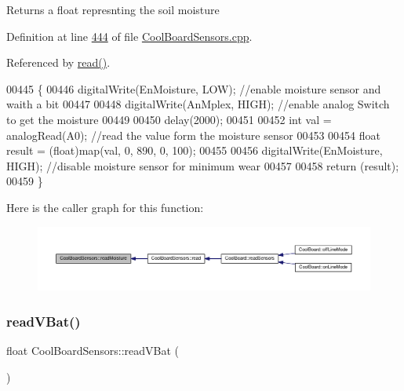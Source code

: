 \begin{DoxyReturn}{Returns}
a float represnting the soil moisture 
\end{DoxyReturn}


Definition at line \hyperlink{_cool_board_sensors_8cpp_source_l00444}{444} of file \hyperlink{_cool_board_sensors_8cpp_source}{Cool\+Board\+Sensors.\+cpp}.



Referenced by \hyperlink{_cool_board_sensors_8cpp_source_l00123}{read()}.


\begin{DoxyCode}
00445 \{
00446       digitalWrite(EnMoisture, LOW);                 \textcolor{comment}{//enable moisture sensor and waith a bit}
00447       
00448       digitalWrite(AnMplex, HIGH);          \textcolor{comment}{//enable analog Switch to get the moisture}
00449       
00450       delay(2000);
00451       
00452       \textcolor{keywordtype}{int} val = analogRead(A0);                       \textcolor{comment}{//read the value form the moisture sensor}
00453       
00454       \textcolor{keywordtype}{float} result = (float)map(val, 0, 890, 0, 100);   
00455 
00456       digitalWrite(EnMoisture, HIGH);                  \textcolor{comment}{//disable moisture sensor for minimum wear}
00457       
00458       \textcolor{keywordflow}{return} (result);
00459 \}
\end{DoxyCode}
Here is the caller graph for this function\+:
\nopagebreak
\begin{figure}[H]
\begin{center}
\leavevmode
\includegraphics[width=350pt]{class_cool_board_sensors_a8761bff50373c485f4465c8db47d0633_icgraph}
\end{center}
\end{figure}
\mbox{\label{class_cool_board_sensors_a6944b6ea7bce8e2fce1b434acfd9d5f3}} 
\subsubsection{\texorpdfstring{read\+V\+Bat()}{readVBat()}}
{\footnotesize\ttfamily float Cool\+Board\+Sensors\+::read\+V\+Bat (\begin{DoxyParamCaption}{ }\end{DoxyParamCaption})}

